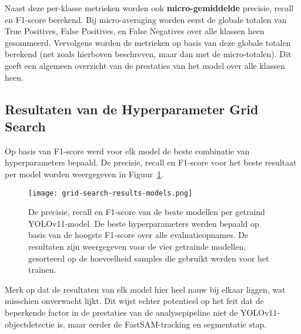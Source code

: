Naast deze per-klasse metrieken worden ook \textbf{micro-gemiddelde} precisie, recall en F1-score berekend. 
Bij micro-averaging worden eerst de globale totalen van True Positives, False Positives, en False Negatives over alle klassen heen gesommeerd. 
Vervolgens worden de metrieken op basis van deze globale totalen berekend (net zoals hierboven beschreven, maar dan met de micro-totalen).
Dit geeft een algemeen overzicht van de prestaties van het model over alle klassen heen.

\subsection{Resultaten van de Hyperparameter Grid Search}

Op basis van F1-score werd voor elk model de beste combinatie van hyperparameters bepaald.
De precisie, recall en F1-score voor het beste resultaat per model worden weergegeven in Figuur~\ref{fig:best-models-metrics}.
\begin{figure}[H]
  \centering
  \texttt{[image: grid-search-results-models.png]}
  \caption[
    Precisie, recall en F1-score van de beste modellen per getraind YOLOv11-model
  ]{\label{fig:best-models-metrics} 
    De precisie, recall en F1-score van de beste modellen per getraind YOLOv11-model.
    De beste hyperparameters werden bepaald op basis van de hoogste F1-score over alle evaluatieopnames.
    De resultaten zijn weergegeven voor de vier getrainde modellen, gesorteerd op de hoeveelheid samples die gebruikt werden voor het trainen.
    }
\end{figure}
Merk op dat de resultaten van elk model hier heel nauw bij elkaar liggen, wat misschien onverwacht lijkt.
Dit wijst echter potentieel op het feit dat de beperkende factor in de prestaties van de analysepipeline niet de YOLOv11-objectdetectie is,
maar eerder de FastSAM-tracking en segmentatie stap.

